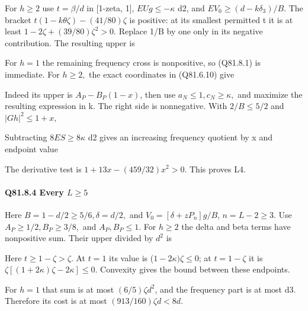 For \(h\ge 2\) use \(t=\beta/d\) in [1-zeta, 1], \(EUg\le -\kappa\) d2, and
\(EV_0\ge(d-k\delta_3)/B\). The bracket
\(t(1-k\theta\zeta)-(41/80)\zeta\) is positive: at its smallest
permitted t it is at least \(1-2\zeta+(39/80)\zeta^2>0\).
Replace 1/B by one only in its negative contribution. The resulting
upper is


For \(h=1\) the remaining frequency cross is nonpositive, so (Q81.8.1)
is immediate. For \(h\ge 2,\allowbreak \) the exact coordinates in (Q81.6.10) give


Indeed its upper is \(A_P-B_P(1-x)\), then use \(a_N\le 1,\allowbreak  c_N\ge \kappa,\allowbreak \) and maximize the resulting expression in k.
The right side is nonnegative. With \(2/B\le 5/2\) and \(|Gh|^2\le 1+x,\allowbreak \)


Subtracting \(8ES\ge 8\kappa\) d2 gives an increasing frequency quotient
by x and endpoint value


The derivative test is \(1+13x-(459/32)x^2>0\). This proves L4.

\paragraph{Q81.8.4 Every \(L\ge 5\)}

Here \(B=1-d/2\ge 5/6,\allowbreak  \delta=d/2,\allowbreak \) and \(V_0=[\delta+zP_n]g/B\),
\(n=L-2\ge 3.\) Use \(A_P\ge 1/2,\allowbreak  B_P\ge 3/8,\allowbreak \) and \(A_P,\allowbreak  B_P\le 1.\)
For \(h\ge 2\) the delta and beta terms have nonpositive sum. Their upper
divided by \(d^2\) is


Here \(t\ge 1-\zeta>\zeta.\) At \(t=1\) its value is (\(1-2\kappa)\zeta\le 0\);
at \(t=1-\zeta\) it is \(\zeta[(1+2\kappa)\zeta-2\kappa]\le0\).
Convexity gives the bound between these endpoints.

For \(h=1\) that sum is at most \((6/5)\zeta d^2\), and the frequency
part is at most d3. Therefore its cost is at most
\((913/160)\zeta d<8d\).

